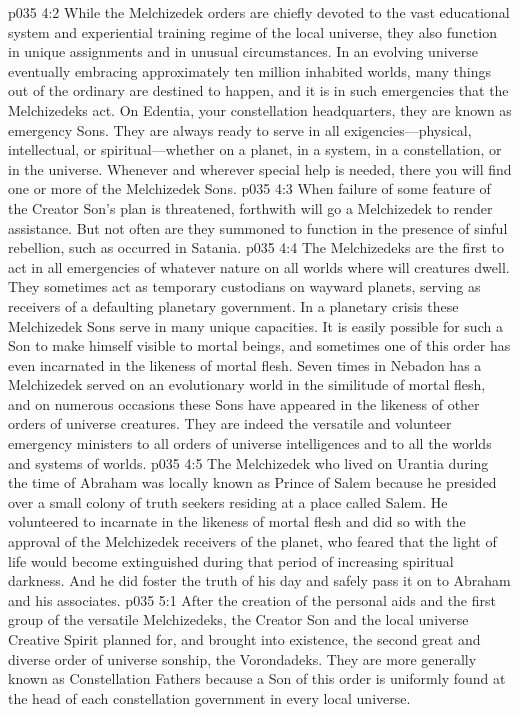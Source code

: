 \pc \vs p035 4:2 While the Melchizedek orders are chiefly devoted to the vast educational system and experiential training regime of the local universe, they also function in unique assignments and in unusual circumstances. In an evolving universe eventually embracing approximately ten million inhabited worlds, many things out of the ordinary are destined to happen, and it is in such emergencies that the Melchizedeks act. On Edentia, your constellation headquarters, they are known as emergency Sons. They are always ready to serve in all exigencies---physical, intellectual, or spiritual---whether on a planet, in a system, in a constellation, or in the universe. Whenever and wherever special help is needed, there you will find one or more of the Melchizedek Sons.
\vs p035 4:3 When failure of some feature of the Creator Son’s plan is threatened, forthwith will go a Melchizedek to render assistance. But not often are they summoned to function in the presence of sinful rebellion, such as occurred in Satania.
\vs p035 4:4 The Melchizedeks are the first to act in all emergencies of whatever nature on all worlds where will creatures dwell. They sometimes act as temporary custodians on wayward planets, serving as receivers of a defaulting planetary government. In a planetary crisis these Melchizedek Sons serve in many unique capacities. It is easily possible for such a Son to make himself visible to mortal beings, and sometimes one of this order has even incarnated in the likeness of mortal flesh. Seven times in Nebadon has a Melchizedek served on an evolutionary world in the similitude of mortal flesh, and on numerous occasions these Sons have appeared in the likeness of other orders of universe creatures. They are indeed the versatile and volunteer emergency ministers to all orders of universe intelligences and to all the worlds and systems of worlds.
\pc \vs p035 4:5 The Melchizedek who lived on Urantia during the time of Abraham was locally known as Prince of Salem because he presided over a small colony of truth seekers residing at a place called Salem. He volunteered to incarnate in the likeness of mortal flesh and did so with the approval of the Melchizedek receivers of the planet, who feared that the light of life would become extinguished during that period of increasing spiritual darkness. And he did foster the truth of his day and safely pass it on to Abraham and his associates.
\vs p035 5:1 After the creation of the personal aids and the first group of the versatile Melchizedeks, the Creator Son and the local universe Creative Spirit planned for, and brought into existence, the second great and diverse order of universe sonship, the Vorondadeks. They are more generally known as Constellation Fathers because a Son of this order is uniformly found at the head of each constellation government in every local universe.
